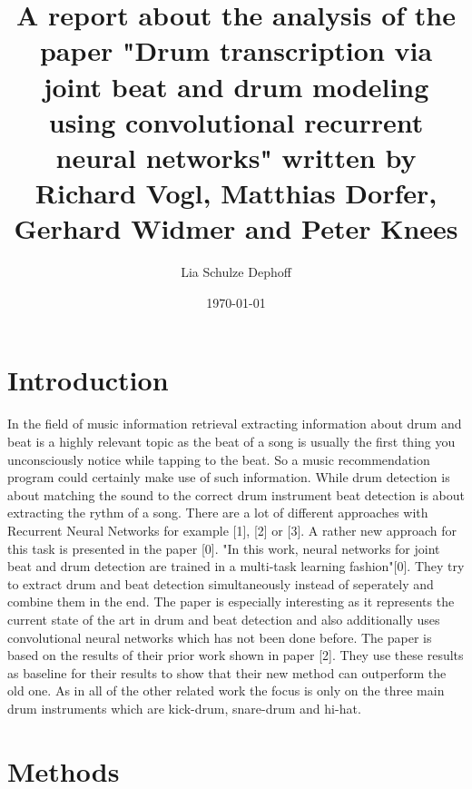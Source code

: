 \documentclass[11pt,twocolumn]{article}
\begin{document}

\title{A report about the analysis of the paper "Drum transcription via joint beat and drum modeling using convolutional recurrent neural networks" written by Richard Vogl, Matthias Dorfer, Gerhard Widmer and Peter Knees\hfill}
\author{Lia Schulze Dephoff}
\date{\today}

\maketitle


\section*{Introduction} 

In the field of music information retrieval extracting information about drum and beat is a highly relevant topic as the beat of a song is usually the first thing you unconsciously notice while tapping to the beat. So a music recommendation program could certainly make use of such information.\newline
While drum detection is about matching the sound to the correct drum instrument beat detection is about extracting the rythm of a song.
There are a lot of different approaches with Recurrent Neural Networks for example [1], [2] or [3]. A rather new approach for this task is presented in the paper [0]. "In this work, neural networks for joint beat and drum detection are trained in a multi-task learning fashion"[0]. They try to extract drum and beat detection simultaneously instead of seperately and combine them in the end. The paper is especially interesting as it represents the current state of the art in drum and beat detection and also additionally uses convolutional neural networks which has not been done before. The paper is based on the results of their prior work shown in paper [2]. They use these results as baseline for their results to show that their new method can outperform the old one. As in all of the other related work the focus is only on the three main drum instruments which are kick-drum, snare-drum and hi-hat.

\section*{Methods}
\end{document}
